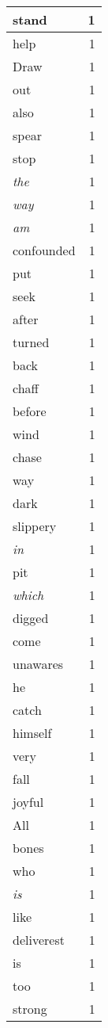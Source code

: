 \begin{center}
\begin{longtable}{l|r}
stand & 1 \\ \hline
help & 1 \\ \hline
Draw & 1 \\ \hline
out & 1 \\ \hline
also & 1 \\ \hline
spear & 1 \\ \hline
stop & 1 \\ \hline
\emph{the} & 1 \\ \hline
\emph{way} & 1 \\ \hline
\emph{am} & 1 \\ \hline
confounded & 1 \\ \hline
put & 1 \\ \hline
seek & 1 \\ \hline
after & 1 \\ \hline
turned & 1 \\ \hline
back & 1 \\ \hline
chaff & 1 \\ \hline
before & 1 \\ \hline
wind & 1 \\ \hline
chase & 1 \\ \hline
way & 1 \\ \hline
dark & 1 \\ \hline
slippery & 1 \\ \hline
\emph{in} & 1 \\ \hline
pit & 1 \\ \hline
\emph{which} & 1 \\ \hline
digged & 1 \\ \hline
come & 1 \\ \hline
unawares & 1 \\ \hline
he & 1 \\ \hline
catch & 1 \\ \hline
himself & 1 \\ \hline
very & 1 \\ \hline
fall & 1 \\ \hline
joyful & 1 \\ \hline
All & 1 \\ \hline
bones & 1 \\ \hline
who & 1 \\ \hline
\emph{is} & 1 \\ \hline
like & 1 \\ \hline
deliverest & 1 \\ \hline
is & 1 \\ \hline
too & 1 \\ \hline
strong & 1 \\ \hline

\end{longtable}
\end{center}
